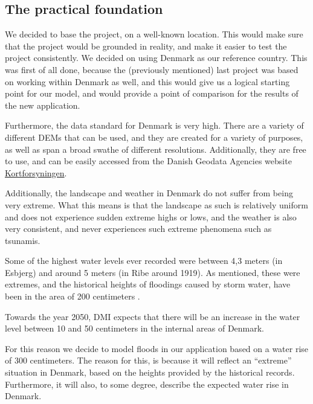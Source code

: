 \subsection{The practical foundation}
We decided to base the project, on a well-known location. This would make sure that the project would be grounded in reality, and make it easier to test the project consistently.
We decided on using Denmark as our reference country. This was first of all done, because the (previously mentioned) last project was based on working within Denmark as well, and this would give us a logical starting point for our model, and would provide a point of comparison for the results of the new application. 

Furthermore, the data standard for Denmark is very high. There are a variety of different DEMs that can be used, and they are created for a variety of purposes, as well as span a broad swathe of different resolutions. Additionally, they are free to use, and can be easily accessed from the Danish Geodata Agencies website {\href{http//:www.kortforsyningen.dk}{Kortforsyningen}}. 

Additionally, the landscape and weather in Denmark do not suffer from being very extreme. What this means is that the landscape as such is relatively uniform and does not experience sudden extreme highs or lows, and  the weather is also very consistent, and never experiences such extreme phenomena such as tsunamis. 

Some of the highest water levels ever recorded were between 4,3 meters (in Esbjerg) and around 5 meters (in Ribe around 1919). As mentioned, these were extremes, and the historical heights of floodings caused by storm water, have been in the area of 200 centimeters \citep{kyst}.

Towards the year 2050, DMI expects that there will be an increase in the water level between 10 and 50 centimeters in the internal areas of Denmark. \citep{dmi}

For this reason we decide to model floods in our application based on a water rise of 300 centimeters. The reason for this, is because it will reflect an “extreme” situation in Denmark, based on the heights provided by the historical records. Furthermore, it will also, to some degree, describe the expected water rise in Denmark.

